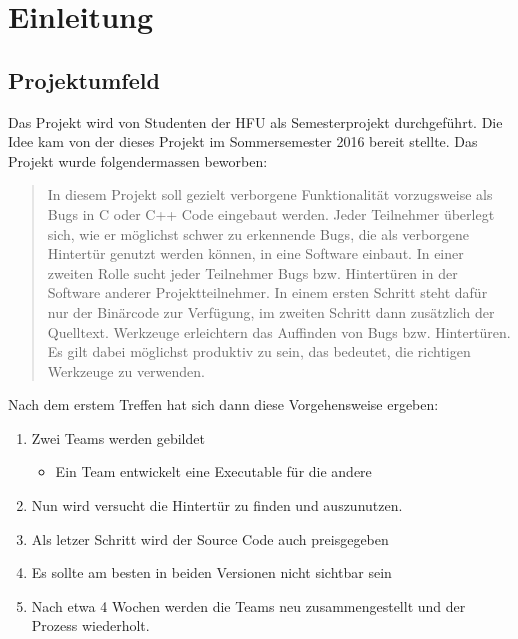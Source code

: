 \chapter{Einleitung}

\section{Projektumfeld}\label{projektumfeld}

Das Projekt wird von Studenten der HFU als Semesterprojekt durchgeführt.
Die Idee kam von \kaspar der dieses Projekt im Sommersemester 2016
bereit stellte. Das Projekt wurde folgendermassen beworben:

\begin{quote}
In diesem Projekt soll gezielt verborgene Funktionalität vorzugsweise
als Bugs in C oder C++ Code eingebaut werden. Jeder Teilnehmer überlegt
sich, wie er möglichst schwer zu erkennende Bugs, die als verborgene
Hintertür genutzt werden können, in eine Software einbaut. In einer
zweiten Rolle sucht jeder Teilnehmer Bugs bzw. Hintertüren in der
Software anderer Projektteilnehmer. In einem ersten Schritt steht dafür
nur der Binärcode zur Verfügung, im zweiten Schritt dann zusätzlich der
Quelltext. Werkzeuge erleichtern das Auffinden von Bugs bzw.
Hintertüren. Es gilt dabei möglichst produktiv zu sein, das bedeutet,
die richtigen Werkzeuge zu verwenden.
\end{quote}

Nach dem erstem Treffen hat sich dann diese Vorgehensweise ergeben:

\begin{enumerate}
\def\labelenumi{\arabic{enumi}.}
\tightlist
\item
  Zwei Teams werden gebildet

  \begin{itemize}
  \tightlist
  \item
    Ein Team entwickelt eine Executable für die andere
  \end{itemize}
\item
  Nun wird versucht die Hintertür zu finden und auszunutzen.
\item
  Als letzer Schritt wird der Source Code auch preisgegeben
\item
  Es sollte am besten in beiden Versionen nicht sichtbar sein
\item
  Nach etwa 4 Wochen werden die Teams neu zusammengestellt und der
  Prozess wiederholt.
\end{enumerate}

